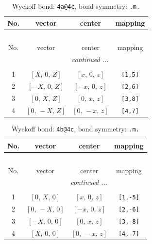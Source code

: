 \documentclass[fleqn,8pt]{jsarticle}
\begin{document}
\begin{longtable}{cccc}
\caption{Wyckoff bond: {\tt 4a@4c}, bond symmetry: {\tt .m.}}
 \\
 \hline \hline
No. & vector & center & mapping \\ \hline \endfirsthead

\multicolumn{3}{l}{\tablename\ \thetable{}} \\
 \hline \hline
No. & vector & center & mapping \\ \hline \endhead

 \hline \hline
\multicolumn{3}{r}{\footnotesize\it continued ...} \\ \endfoot

 \hline \hline
\multicolumn{3}{r}{} \\ \endlastfoot

1 & $\left[ X,\, 0,\, Z \right]$ & $\left[ x,\, 0,\, z \right]$ & {\tt [1,5]} \\ \hline
2 & $\left[ - X,\, 0,\, Z \right]$ & $\left[ - x,\, 0,\, z \right]$ & {\tt [2,6]} \\ \hline
3 & $\left[ 0,\, X,\, Z \right]$ & $\left[ 0,\, x,\, z \right]$ & {\tt [3,8]} \\ \hline
4 & $\left[ 0,\, - X,\, Z \right]$ & $\left[ 0,\, - x,\, z \right]$ & {\tt [4,7]} \\
\end{longtable}
\renewcommand{\arraystretch}{1.2}
\begin{longtable}{cccc}
\caption{Wyckoff bond: {\tt 4b@4c}, bond symmetry: {\tt .m.}}
 \\
 \hline \hline
No. & vector & center & mapping \\ \hline \endfirsthead

\multicolumn{3}{l}{\tablename\ \thetable{}} \\
 \hline \hline
No. & vector & center & mapping \\ \hline \endhead

 \hline \hline
\multicolumn{3}{r}{\footnotesize\it continued ...} \\ \endfoot

 \hline \hline
\multicolumn{3}{r}{} \\ \endlastfoot

1 & $\left[ 0,\, X,\, 0 \right]$ & $\left[ x,\, 0,\, z \right]$ & {\tt [1,-5]} \\ \hline
2 & $\left[ 0,\, - X,\, 0 \right]$ & $\left[ - x,\, 0,\, z \right]$ & {\tt [2,-6]} \\ \hline
3 & $\left[ - X,\, 0,\, 0 \right]$ & $\left[ 0,\, x,\, z \right]$ & {\tt [3,-8]} \\ \hline
4 & $\left[ X,\, 0,\, 0 \right]$ & $\left[ 0,\, - x,\, z \right]$ & {\tt [4,-7]} \\
\end{longtable}
\end{document}
